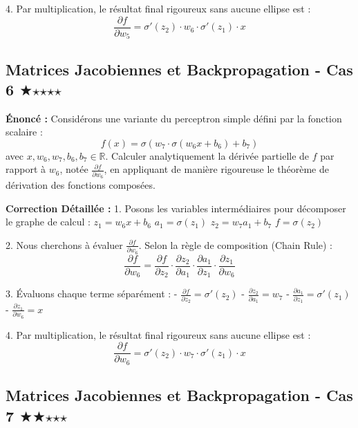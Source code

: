 \documentclass[11pt,a4paper]{article}
\begin{document}
4. Par multiplication, le résultat final rigoureux sans aucune ellipse est :
   $$ \frac{{\partial f}}{{\partial w_{5}}} = \sigma'(z_2) \cdot w_{6} \cdot \sigma'(z_1) \cdot x $$

\vspace{1cm}

\subsection*{Matrices Jacobiennes et Backpropagation - Cas 6 $\bigstar$$\star$$\star$$\star$$\star$}

\textbf{Énoncé :}
Considérons une variante du perceptron simple défini par la fonction scalaire :
$$ f(x) = \sigma(w_{7} \cdot \sigma(w_{6} x + b_{6}) + b_{7}) $$
avec $x, w_{6}, w_{7}, b_{6}, b_{7} \in \mathbb{R}$.
Calculer analytiquement la dérivée partielle de $f$ par rapport à $w_{6}$, notée $\frac{{\partial f}}{{\partial w_{6}}}$, en appliquant de manière rigoureuse le théorème de dérivation des fonctions composées.

\textbf{Correction Détaillée :}
1. Posons les variables intermédiaires pour décomposer le graphe de calcul :
   $z_1 = w_{6} x + b_{6}$
   $a_1 = \sigma(z_1)$
   $z_2 = w_{7} a_1 + b_{7}$
   $f = \sigma(z_2)$

2. Nous cherchons à évaluer $\frac{{\partial f}}{{\partial w_{6}}}$. Selon la règle de composition (Chain Rule) :
   $$ \frac{{\partial f}}{{\partial w_{6}}} = \frac{{\partial f}}{{\partial z_2}} \cdot \frac{{\partial z_2}}{{\partial a_1}} \cdot \frac{{\partial a_1}}{{\partial z_1}} \cdot \frac{{\partial z_1}}{{\partial w_{6}}} $$

3. Évaluons chaque terme séparément :
   - $\frac{{\partial f}}{{\partial z_2}} = \sigma'(z_2)$
   - $\frac{{\partial z_2}}{{\partial a_1}} = w_{7}$
   - $\frac{{\partial a_1}}{{\partial z_1}} = \sigma'(z_1)$
   - $\frac{{\partial z_1}}{{\partial w_{6}}} = x$

4. Par multiplication, le résultat final rigoureux sans aucune ellipse est :
   $$ \frac{{\partial f}}{{\partial w_{6}}} = \sigma'(z_2) \cdot w_{7} \cdot \sigma'(z_1) \cdot x $$

\vspace{1cm}

\subsection*{Matrices Jacobiennes et Backpropagation - Cas 7 $\bigstar$$\bigstar$$\star$$\star$$\star$}
\end{document}
